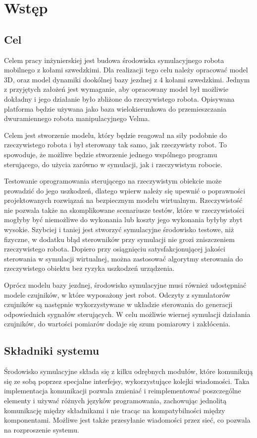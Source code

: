 \chapter{Wstęp}
\label{sec:description}
	\section{Cel}
	Celem pracy inżynierskiej jest budowa środowiska symulacyjnego robota mobilnego z kołami szwedzkimi.
	Dla realizacji tego celu należy opracować model 3D, oraz model dynamiki dookólnej bazy jezdnej z 4 kołami szwedzkimi.
	Jednym z przyjętych założeń jest wymaganie, aby opracowany model był możliwie dokładny i jego działanie było zbliżone do rzeczywistego robota.
	Opisywana platforma będzie używana jako baza wielokierunkowa do przemieszczania dwuramiennego robota manipulacyjnego Velma.

	Celem jest stworzenie modelu, który będzie reagował na siły podobnie do rzeczywistego robota i był sterowany tak samo, jak rzeczywisty robot.
	To spowoduje, że możliwe będzie stworzenie jednego wspólnego programu sterującego, do użycia zarówno w symulacji, jak i rzeczywistym robocie.

	Testowanie oprogramowania sterującego na rzeczywistym obiekcie może prowadzić do jego uszkodzeń, 
	dlatego wpierw należy się upewnić o poprawności projektowanych rozwiązań na bezpiecznym modelu wirtualnym.
	Rzeczywistość nie pozwala także na skomplikowane scenariusze testów, które w rzeczywistości mogłyby być niemożliwe do wykonania lub koszty jego wykonania byłyby zbyt wysokie.
	Szybciej i taniej jest stworzyć symulacyjne środowisko testowe, niż fizyczne, w dodatku błąd sterowników przy symulacji nie grozi zniszczeniem rzeczywistego robota.
	Dopiero przy osiągnięciu satysfakcjonującej jakości sterowania w symulacji wirtualnej, 
	można zastosować algorytmy sterowania do rzeczywistego obiektu bez ryzyka uszkodzeń urządzenia.

	Oprócz modelu bazy jezdnej, środowisko symulacyjne musi również udostępniać modele czujników, w które wyposażony jest robot. 
	Odczyty z symulatorów czujników są następnie wykorzystywane w układzie sterowania do generacji odpowiednich sygnałów sterujących.
	W celu możliwie wiernej symulacji działania czujników, do wartości pomiarów dodaje się szum pomiarowy i zakłócenia.

\section{Składniki systemu}
	Środowisko symulacyjne składa się z kilku odrębnych modułów, które komunikują się ze sobą poprzez specjalne interfejsy, wykorzystujące kolejki wiadomości.
	Taka implementacja komunikacji pozwala zmieniać i reimplementować poszczególne elementy i używać różnych języków programowania, 
	zachowując jednolitą komunikację między składnikami i nie tracąc na kompatybilności między komponentami.
	Możliwe jest także przesyłanie wiadomości przez sieć, co pozwala na rozproszenie systemu.

